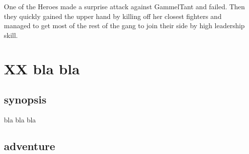 One of the Heroes made a surprise attack against GammelTant and failed. Then they quickly gained the upper hand by killing off her closest fighters and managed to get most of the rest of the gang to join their side by high leadership skill.
































































\newpage
\section*{XX bla bla}


\subsection*{synopsis}

bla bla bla


\subsection*{adventure}

